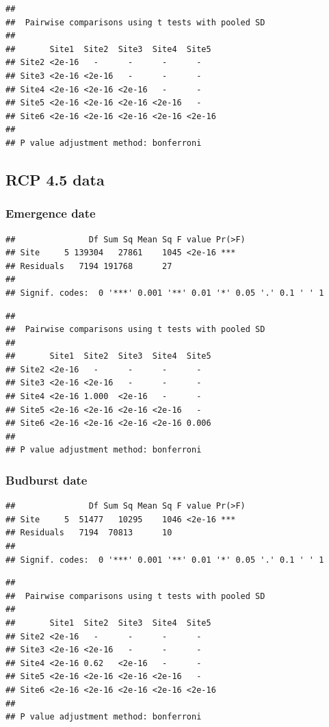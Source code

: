 \documentclass[12 pt]{article}
\begin{document}
\begin{verbatim}
## 
##  Pairwise comparisons using t tests with pooled SD 
##  
##       Site1  Site2  Site3  Site4  Site5 
## Site2 <2e-16   -      -      -      -     
## Site3 <2e-16 <2e-16   -      -      -     
## Site4 <2e-16 <2e-16 <2e-16   -      -     
## Site5 <2e-16 <2e-16 <2e-16 <2e-16   -     
## Site6 <2e-16 <2e-16 <2e-16 <2e-16 <2e-16
## 
## P value adjustment method: bonferroni
\end{verbatim}

\subsection{RCP 4.5 data}
\subsubsection*{Emergence date}

\begin{verbatim}
##               Df Sum Sq Mean Sq F value Pr(>F)    
## Site     5 139304   27861    1045 <2e-16 ***
## Residuals   7194 191768      27                   
## 
## Signif. codes:  0 '***' 0.001 '**' 0.01 '*' 0.05 '.' 0.1 ' ' 1
\end{verbatim}

\begin{verbatim}
## 
##  Pairwise comparisons using t tests with pooled SD 
##  
##       Site1  Site2  Site3  Site4  Site5
## Site2 <2e-16   -      -      -      -    
## Site3 <2e-16 <2e-16   -      -      -    
## Site4 <2e-16 1.000  <2e-16   -      -    
## Site5 <2e-16 <2e-16 <2e-16 <2e-16   -    
## Site6 <2e-16 <2e-16 <2e-16 <2e-16 0.006
## 
## P value adjustment method: bonferroni
\end{verbatim}

\subsubsection*{Budburst date}

\begin{verbatim}
##               Df Sum Sq Mean Sq F value Pr(>F)    
## Site     5  51477   10295    1046 <2e-16 ***
## Residuals   7194  70813      10                   
## 
## Signif. codes:  0 '***' 0.001 '**' 0.01 '*' 0.05 '.' 0.1 ' ' 1
\end{verbatim}

\begin{verbatim}
## 
##  Pairwise comparisons using t tests with pooled SD 
## 
##       Site1  Site2  Site3  Site4  Site5 
## Site2 <2e-16   -      -      -      -     
## Site3 <2e-16 <2e-16   -      -      -     
## Site4 <2e-16 0.62   <2e-16   -      -     
## Site5 <2e-16 <2e-16 <2e-16 <2e-16   -     
## Site6 <2e-16 <2e-16 <2e-16 <2e-16 <2e-16
## 
## P value adjustment method: bonferroni
\end{verbatim}
\end{document}
